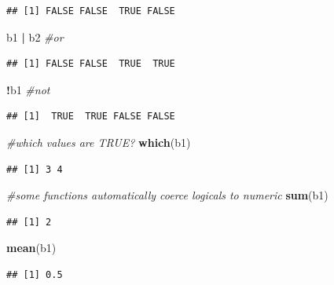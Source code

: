 \documentclass[]{article}
\newenvironment{Shaded}{\begin{snugshade}}{\end{snugshade}}
\newcommand{\KeywordTok}[1]{\textcolor[rgb]{0.13,0.29,0.53}{\textbf{#1}}}
\newcommand{\StringTok}[1]{\textcolor[rgb]{0.31,0.60,0.02}{#1}}
\newcommand{\CommentTok}[1]{\textcolor[rgb]{0.56,0.35,0.01}{\textit{#1}}}
\newcommand{\OperatorTok}[1]{\textcolor[rgb]{0.81,0.36,0.00}{\textbf{#1}}}
\newcommand{\NormalTok}[1]{#1}
\begin{document}
\begin{verbatim}
## [1] FALSE FALSE  TRUE FALSE
\end{verbatim}

\begin{Shaded}
\begin{Highlighting}[]
\NormalTok{b1 }\OperatorTok{|}\StringTok{ }\NormalTok{b2 }\CommentTok{#or}
\end{Highlighting}
\end{Shaded}

\begin{verbatim}
## [1] FALSE FALSE  TRUE  TRUE
\end{verbatim}

\begin{Shaded}
\begin{Highlighting}[]
\OperatorTok{!}\NormalTok{b1 }\CommentTok{#not}
\end{Highlighting}
\end{Shaded}

\begin{verbatim}
## [1]  TRUE  TRUE FALSE FALSE
\end{verbatim}

\begin{Shaded}
\begin{Highlighting}[]
\CommentTok{#which values are TRUE?}
\KeywordTok{which}\NormalTok{(b1)}
\end{Highlighting}
\end{Shaded}

\begin{verbatim}
## [1] 3 4
\end{verbatim}

\begin{Shaded}
\begin{Highlighting}[]
\CommentTok{#some functions automatically coerce logicals to numeric}
\KeywordTok{sum}\NormalTok{(b1)}
\end{Highlighting}
\end{Shaded}

\begin{verbatim}
## [1] 2
\end{verbatim}

\begin{Shaded}
\begin{Highlighting}[]
\KeywordTok{mean}\NormalTok{(b1)}
\end{Highlighting}
\end{Shaded}

\begin{verbatim}
## [1] 0.5
\end{verbatim}
\end{document}
